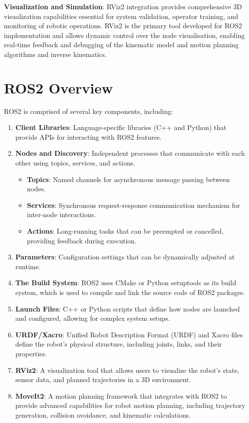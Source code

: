 \documentclass[10pt,a4paper,english]{article}
\begin{document}
\textbf{Visualization and Simulation}: RViz2 integration provides comprehensive 3D visualization capabilities essential for system validation, operator training, and monitoring of robotic operations. RViz2 is the primary tool developed for ROS2 implementation and allows dynamic control over the node visualisation, enabling real-time feedback and debugging of the kinematic model and motion planning algorithms and inverse kinematics.

\newpage



\section{ROS2 Overview}

ROS2 is comprised of several key components, including:

\begin{enumerate}
    \item \textbf{Client Libraries}: Language-specific libraries (C++ and Python) that provide APIs for interacting with ROS2 features.
    \item \textbf{Nodes and Discovery}: Independent processes that communicate with each other using topics, services, and actions.
    \begin{itemize}
        \item \textbf{Topics}: Named channels for asynchronous message passing between nodes.
        \item \textbf{Services}: Synchronous request-response communication mechanism for inter-node interactions.
        \item \textbf{Actions}: Long-running tasks that can be preempted or cancelled, providing feedback during execution.
    \end{itemize}
    \item \textbf{Parameters}: Configuration settings that can be dynamically adjusted at runtime.
    \item \textbf{The Build System}: ROS2 uses CMake or Python setuptools as its build system, which is used to compile and link the source code of ROS2 packages.
    \item \textbf{Launch Files}: C++ or Python scripts that define how nodes are launched and configured, allowing for complex system setups.
    \item \textbf{URDF/Xacro}: Unified Robot Description Format (URDF) and Xacro files define the robot's physical structure, including joints, links, and their properties.
    \item \textbf{RViz2}: A visualization tool that allows users to visualize the robot's state, sensor data, and planned trajectories in a 3D environment.
    \item \textbf{MoveIt2}: A motion planning framework that integrates with ROS2 to provide advanced capabilities for robot motion planning, including trajectory generation, collision avoidance, and kinematic calculations.
\end{enumerate}
\end{document}
